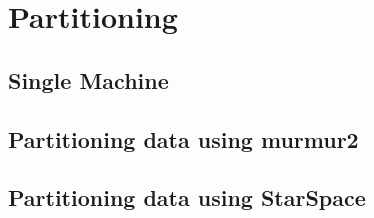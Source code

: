 \section{Partitioning}
\label{sec:partitioning}

\subsection{Single Machine}
\label{subsec:partitioning-single-machine}


\subsection{Partitioning data using murmur2}
\label{subsec:partitioning-murmur2}


\subsection{Partitioning data using StarSpace}
\label{subsec:partitioning-star-space}
